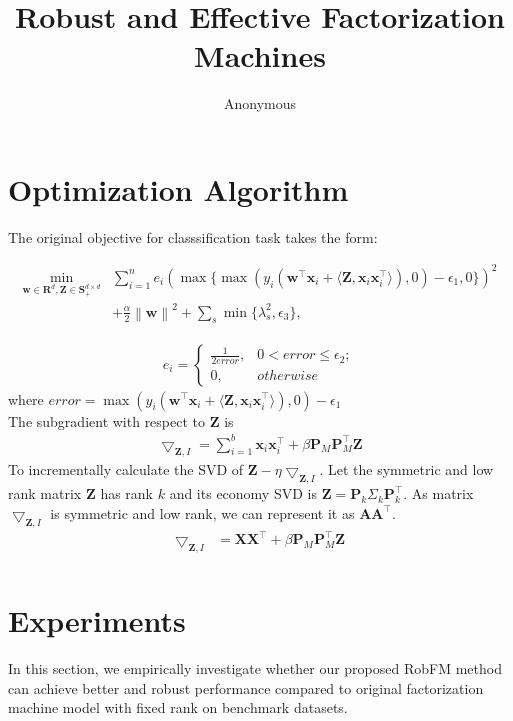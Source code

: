 \documentclass[letterpaper]{article} %
\newcommand\norm[1]{\left\lVert#1\right\rVert}
\def \x {\mathbf{x}}
\def \X {\mathbf{X}}
\def \w {\mathbf{w}}
\def \Z {\mathbf{Z}}
\def \A {\mathbf{A}}
\def \P {\mathbf{P}}
\begin{document}
%
\title{Robust and Effective Factorization Machines}
\author{Anonymous
}
\maketitle

\section{Optimization Algorithm}
The original objective for classsification task takes the form:
\begin{small}
\begin{align}
	\min_{\w \in \mathbf{R}^d,\Z \in \mathbf{S}_{+}^{d \times d}} &\sum_{i=1}^{n}e_i(\max\{\max(y_i(\w^\top\x_i+\langle\Z, \x_i\x_i^\top\rangle),0)-\epsilon_1,0\})^2 \nonumber \\ 
	&+ \frac{\alpha}{2}\norm{\w}^2 + \sum_s\min\{\lambda_s^2, \epsilon_3\},
\end{align}
\end{small}
\begin{align}
e_i=
	\begin{cases}
	\frac{1}{2error},& 0 < error \leq \epsilon_2;\\
	0, & otherwise
	\end{cases}\nonumber
\end{align}
where $error=\max(y_i(\w^\top\x_i+\langle\Z, \x_i\x_i^\top\rangle),0)-\epsilon_1$\\
The subgradient with respect to $\Z$ is
\begin{align}
\bigtriangledown_{\Z, I} = \sum_{i=1}^{b}{\x_i\x_i^\top} + \beta\P_M\P_M^\top\Z 
\end{align}
To incrementally calculate the SVD of $\Z - \eta \bigtriangledown_{\Z,I}$. Let the symmetric and low rank matrix $\Z$ has rank $k$ and its economy SVD is $\Z=\P_k\Sigma_k\P_k^\top$.
As matrix $\bigtriangledown_{\Z,I}$ is symmetric and low rank, we can represent it as $\A \A^\top$.
\begin{align}
\bigtriangledown_{\Z,I}&=\X\X^\top + \beta\P_M\P_M^\top\Z \\ \nonumber
\end{align}

\section{Experiments}
In this section, we empirically investigate whether our proposed RobFM method can achieve better and robust performance compared to original factorization machine model with fixed rank on benchmark datasets.
\end{document}
